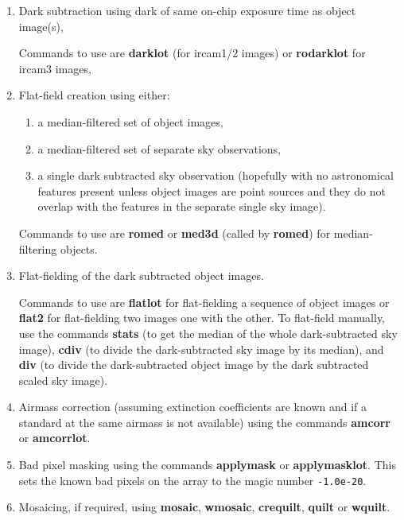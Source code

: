 \begin{enumerate}

\item Dark subtraction using dark of same on-chip exposure time as
object image(s),

Commands to use are {\bf darklot} (for {\sc ircam1/2}
images) or {\bf rodarklot} for {\sc ircam3} images,

\item Flat-field creation using either:

\begin{enumerate}

\item a median-filtered set of object images,
\item a median-filtered set of separate sky observations,
\item a single dark subtracted sky observation (hopefully with no
astronomical features present unless object images are point sources
and they do not overlap with the features in the separate single sky
image).

\end{enumerate}

Commands to use are {\bf romed} or {\bf med3d} (called by {\bf
romed}) for median-filtering objects.

\item Flat-fielding of the dark subtracted object images.

Commands to
use are {\bf flatlot} for flat-fielding a sequence of object images or
{\bf flat2} for flat-fielding two images one with the other.  To flat-field
manually, use the commands {\bf stats} (to get the median of the whole dark-subtracted sky image), {\bf cdiv} (to divide the dark-subtracted sky image by
its median), and {\bf div} (to divide the dark-subtracted object image by the
dark subtracted scaled sky image).

\item Airmass correction (assuming extinction coefficients are known
and if a standard at the same airmass is not available) using the
commands {\bf amcorr} or {\bf amcorrlot}.

\item Bad pixel masking using the commands {\bf applymask} or {\bf
applymasklot}.  This sets the known bad pixels on the array to the
magic number {\tt -1.0e-20}.

\item Mosaicing, if required, using {\bf mosaic}, {\bf wmosaic}, {\bf
crequilt}, {\bf quilt} or {\bf wquilt}.

\end{enumerate}

